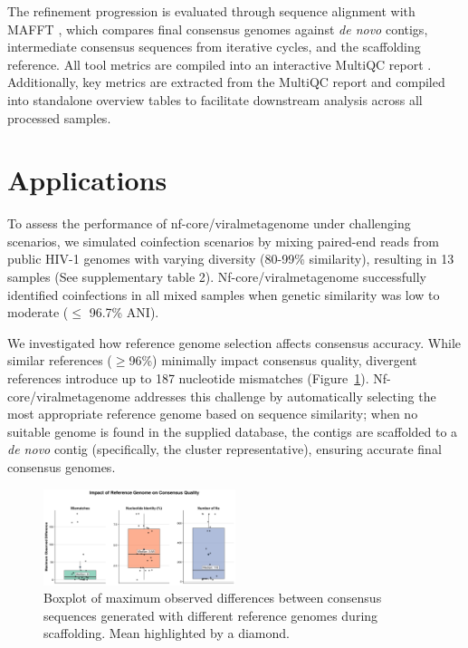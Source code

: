 The refinement progression is evaluated through sequence alignment with MAFFT \cite{Katoh2002-ox}, which compares final consensus genomes against \textit{de novo} contigs, intermediate consensus sequences from iterative cycles, and the scaffolding reference. All tool metrics are compiled into an interactive MultiQC report \cite{Ewels2016-hs}. Additionally, key metrics are extracted from the MultiQC report and compiled into standalone overview tables to facilitate downstream analysis across all processed samples.

\section{Applications}

To assess the performance of nf-core/viralmetagenome under challenging scenarios, we simulated coinfection scenarios by mixing paired-end reads from public HIV-1 genomes with varying diversity (80-99\% similarity), resulting in 13 samples (See supplementary table 2). Nf-core/viralmetagenome successfully identified coinfections in all mixed samples when genetic similarity was low to moderate ($\leq$ 96.7\% ANI).

We investigated how reference genome selection affects consensus accuracy. While similar references ($\geq$96\%) minimally impact consensus quality, divergent references introduce up to 187 nucleotide mismatches (Figure~\ref{fig:reference-influence}). Nf-core/viralmetagenome addresses this challenge by automatically selecting the most appropriate reference genome based on sequence similarity; when no suitable genome is found in the supplied database, the contigs are scaffolded to a \textit{de novo} contig (specifically, the cluster representative), ensuring accurate final consensus genomes.

\begin{figure}[htbp]
    \centering
    \includegraphics[width=0.5\textwidth]{Fig/fig2.png}
    \caption{Boxplot of maximum observed differences between consensus sequences generated with different reference genomes during scaffolding. Mean highlighted by a diamond.}
    \label{fig:reference-influence}
\end{figure}

